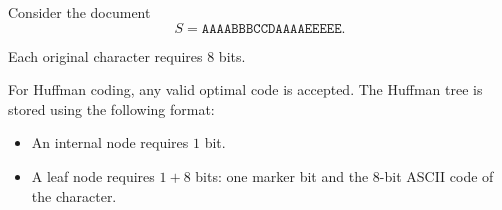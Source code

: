 

Consider the document
\[
S=\texttt{AAAABBBCCDAAAAEEEEE}.
\]

Each original character requires $8$ bits.

For Huffman coding, any valid optimal code is accepted. The Huffman tree is
stored using the following format:

\begin{itemize}
    \item An internal node requires $1$ bit.
    \item A leaf node requires $1+8$ bits: one marker bit and the
    8-bit ASCII code of the character.
\end{itemize}

